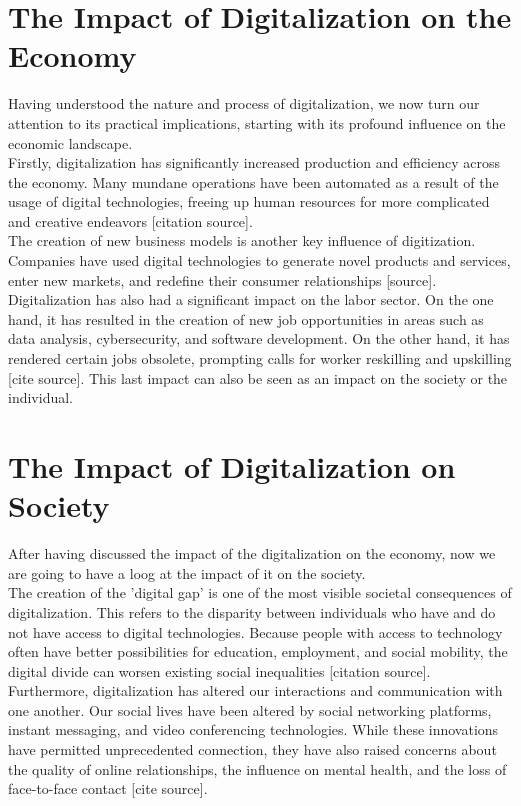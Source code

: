 \documentclass[12pt]{article}
\begin{document}
\section{The Impact of Digitalization on the Economy}
Having understood the nature and process of digitalization, we now turn our attention to its practical implications, starting with its profound influence on the economic landscape. \\
Firstly, digitalization has significantly increased production and efficiency across the economy. Many mundane operations have been automated as a result of the usage of digital technologies, freeing up human resources for more complicated and creative endeavors [citation source]. \\
The creation of new business models is another key influence of digitization. Companies have used digital technologies to generate novel products and services, enter new markets, and redefine their consumer relationships [source]. \\
Digitalization has also had a significant impact on the labor sector. On the one hand, it has resulted in the creation of new job opportunities in areas such as data analysis, cybersecurity, and software development. On the other hand, it has rendered certain jobs obsolete, prompting calls for worker reskilling and upskilling [cite source]. This last impact can also be seen as an impact on the society or the individual.

\section{The Impact of Digitalization on Society}
After having discussed the impact of the digitalization on the economy, now we are going to have a loog at the impact of it on the society. \\
The creation of the 'digital gap' is one of the most visible societal consequences of digitalization. This refers to the disparity between individuals who have and do not have access to digital technologies. Because people with access to technology often have better possibilities for education, employment, and social mobility, the digital divide can worsen existing social inequalities [citation source]. \\
Furthermore, digitalization has altered our interactions and communication with one another. Our social lives have been altered by social networking platforms, instant messaging, and video conferencing technologies. While these innovations have permitted unprecedented connection, they have also raised concerns about the quality of online relationships, the influence on mental health, and the loss of face-to-face contact [cite source].
\end{document}
